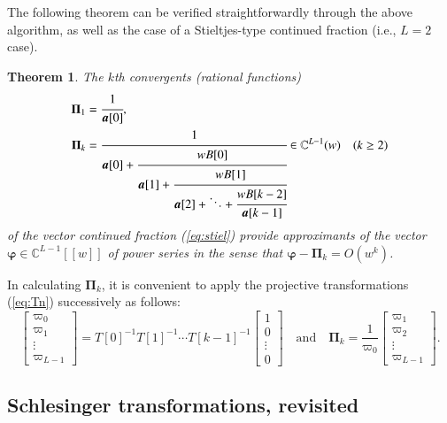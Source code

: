 \documentclass[12pt]{article}
\newtheorem{thm}{Theorem}[section]
\numberwithin{equation}{section}
\begin{document}
The following theorem can be verified straightforwardly through the above algorithm,
as well as the case of a Stieltjes-type continued fraction (i.e., $L=2$ case). 


\begin{thm} 
The $k$th convergents
{\rm(}rational functions{\rm)}
\begin{align*}
{\boldsymbol \Pi}_1&=\cfrac{1}{{\boldsymbol a}[0]},
\\
{\boldsymbol \Pi}_k&= \cfrac{1}{{\boldsymbol a}[0] + \cfrac{ w B[0]}{ {\boldsymbol a}[1] + \cfrac{ w B[1]}{ {\boldsymbol a}[2] + \ddots + \cfrac{w B[k-2] }{ {\boldsymbol a}[k-1]  } }  }}
\in {\mathbb C}^{L-1}(w)
\quad (k \geq 2)
\end{align*}
of the vector continued fraction 
{\rm(\ref{eq:stiel})}
provide approximants of
the vector   
${\boldsymbol \varphi} \in {\mathbb C}^{L-1}[\![w]\!]$
of power series
in the sense that
${\boldsymbol \varphi}- {\boldsymbol \Pi}_k =O(w^k)$.
\end{thm}





In calculating ${\boldsymbol \Pi}_k$,
it is convenient to apply
the projective transformations
(\ref{eq:Tn})
 successively
as follows:
\[
\begin{bmatrix}
\varpi_0 \\ \varpi_1 \\
\vdots \\ \varpi_{L-1}
\end{bmatrix}
=
T[0]^{-1}T[1]^{-1} \cdots T[k-1]^{-1} 
\begin{bmatrix}1 \\0 \\
\vdots \\ 0
\end{bmatrix}
\quad \text{and} \quad
{\boldsymbol \Pi}_k=\frac{1}{\varpi_{0}}\begin{bmatrix}\varpi_1 \\ \varpi_2 \\
\vdots \\ \varpi_{L-1}
\end{bmatrix}.
\]




\subsection{Schlesinger transformations, revisited}
\end{document}
